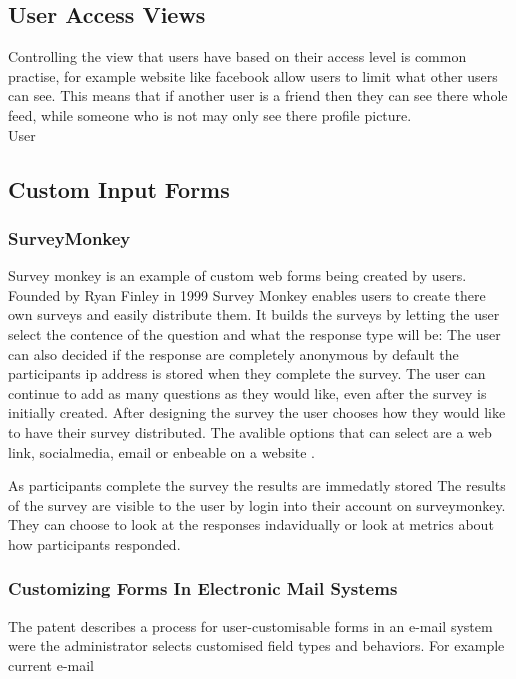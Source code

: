 \documentclass[12pt]{article}  %
\begin{document}
\newpage
\subsection{User Access Views}

Controlling the view that users have based on their access level is common practise, for example website like facebook allow users to limit what other users can see. This means that if another user is a friend then they can see there whole feed, while someone who is not may only see there profile picture.\\
User 


\subsection{Custom Input Forms}


\subsubsection{SurveyMonkey}
Survey monkey \cite{finley_surveymonkey_1999} is an example of custom web forms being created by users. Founded by Ryan Finley in 1999 Survey Monkey enables users to create there own surveys and easily distribute them. It builds the surveys by letting the user select the contence of the question and what the response type will be: The user can also decided if the response are completely anonymous by default the participants ip address is stored when they complete the survey. The user can continue to add as many questions as they would like, even after the survey is initially created. After designing the survey the user chooses how they would like to have their survey distributed. The avalible options that can select are a web link, socialmedia, email or enbeable on a website .  

As participants complete the survey the results are immedatly stored
The results of the survey are visible to the user by login into their account on surveymonkey. They can choose to look at the responses indavidually or look at metrics about how participants responded.

\subsubsection{Customizing Forms In Electronic Mail Systems}
\noindent
The patent  \cite{holt_customizing_2006} describes a process for user-customisable forms in an e-mail system were the administrator selects customised field types and behaviors.  For example current e-mail
\end{document}
